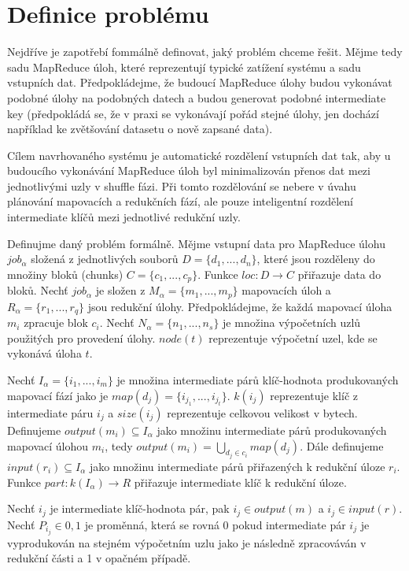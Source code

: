 \documentclass[thesis=M,czech]{FITthesis}[2012/06/26]
\begin{document}
\section{Definice problému}
Nejdříve je zapotřebí fommálně definovat, jaký problém chceme řešit. Mějme tedy sadu MapReduce úloh, které reprezentují typické zatížení systému a sadu vstupních dat. Předpokládejme, že budoucí MapReduce úlohy budou vykonávat podobné úlohy na podobných datech a budou generovat podobné intermediate key (předpokládá se, že v praxi se vykonávají pořád stejné úlohy, jen dochází například ke zvětšování datasetu o nově zapsané data). 

Cílem navrhovaného systému je automatické rozdělení vstupních dat tak, aby u budoucího vykonávání MapReduce úloh byl minimalizován přenos dat mezi jednotlivými uzly v shuffle fázi. Při tomto rozdělování se nebere v úvahu plánování mapovacích a redukčních fází, ale pouze inteligentní rozdělení intermediate klíčů mezi jednotlivé redukční uzly.

	Definujme daný problém formálně. Mějme vstupní data pro MapReduce úlohu $job_\alpha$ složená z jednotlivých souborů $D = \{d_1, ..., d_n\}$, které jsou rozděleny do  množiny bloků (chunks) $C = \{c_1, ..., c_p\}$. Funkce $loc : D \rightarrow C$ přiřazuje data do bloků. Nechť  $job_\alpha$ je složen z $M_\alpha = \{m_1, ..., m_p\}$ mapovacích úloh a $R_\alpha = \{r_1, ..., r_q\}$ jsou redukční úlohy. Předpokládejme, že každá mapovací úloha $m_i$ zpracuje blok $c_i$. Nechť  $N_\alpha = \{n_1, ..., n_s\}$ je množina výpočetních uzlů použitých pro provedení úlohy. $node(t)$ reprezentuje výpočetní uzel, kde se vykonává úloha $t$.

Nechť $I_\alpha = \{i_1, ..., i_m\}$ je množina intermediate párů klíč-hodnota produkovaných mapovací fází jako je $map(d_j) = \{i_{j_1}, ..., i_{j_t}\}$. $k(i_j)$ reprezentuje klíč z intermediate páru $i_j$ a $size(i_j)$ reprezentuje celkovou velikost v bytech. Definujeme $output(m_i) \subseteq I_\alpha$ jako množinu intermediate párů produkovaných mapovací úlohou $m_i$, tedy $output(m_i) = \bigcup_{{d_j}\in{c_i}} map(d_j)$. Dále definujeme $input(r_i)\subseteq I_\alpha$ jako množinu intermediate párů přiřazených k redukční úloze $r_i$. Funkce $part : k(I_\alpha) \rightarrow R$ přiřazuje intermediate klíč k redukční úloze. 

Nechť $i_j$ je intermediate klíč-hodnota pár, pak  $i_j \in output(m)$ a $i_j \in input(r)$. Nechť $P_{i_j} \in {0,1}$ je proměnná, která se rovná 0 pokud intermediate pár $i_j$ je vyprodukován na stejném výpočetním uzlu jako je následně zpracováván v redukční části a 1 v opačném případě.  
\end{document}
